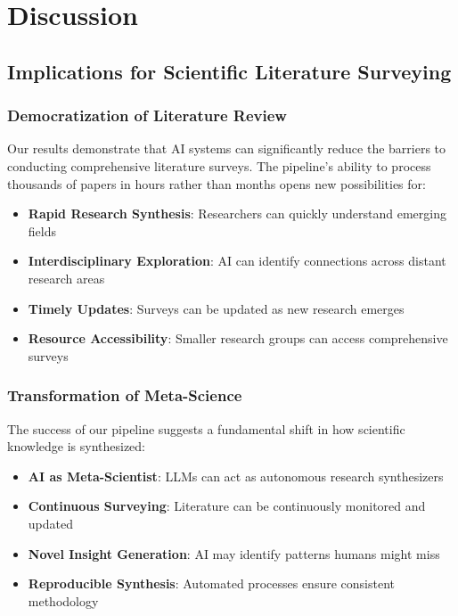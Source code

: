 \section{Discussion}

\subsection{Implications for Scientific Literature Surveying}

\subsubsection{Democratization of Literature Review}

Our results demonstrate that AI systems can significantly reduce the barriers to conducting comprehensive literature surveys. The pipeline's ability to process thousands of papers in hours rather than months opens new possibilities for:

\begin{itemize}
    \item \textbf{Rapid Research Synthesis}: Researchers can quickly understand emerging fields
    \item \textbf{Interdisciplinary Exploration}: AI can identify connections across distant research areas
    \item \textbf{Timely Updates}: Surveys can be updated as new research emerges
    \item \textbf{Resource Accessibility}: Smaller research groups can access comprehensive surveys
\end{itemize}

\subsubsection{Transformation of Meta-Science}

The success of our pipeline suggests a fundamental shift in how scientific knowledge is synthesized:

\begin{itemize}
    \item \textbf{AI as Meta-Scientist}: LLMs can act as autonomous research synthesizers
    \item \textbf{Continuous Surveying}: Literature can be continuously monitored and updated
    \item \textbf{Novel Insight Generation}: AI may identify patterns humans might miss
    \item \textbf{Reproducible Synthesis}: Automated processes ensure consistent methodology
\end{itemize}

